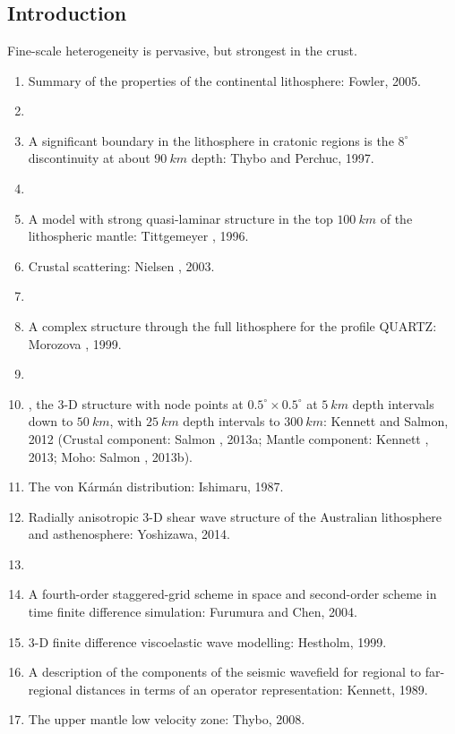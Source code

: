 \renewcommand{\pmk}{Kennett\_2016\_GGG\_Multiscale seismic heterogeneity}
\renewcommand{\prf}{Others/\pmk.pdf}
\renewcommand{\pti}{Multiscale seismic heterogeneity in
the continental lithosphere}
\renewcommand{\pay}{B. L. N. Kennett and T. Furumura, 2016}
\renewcommand{\pjo}{Geochem. Geophys. Geosyst.}
\renewcommand{\pda}{2019/6/2 Sun.}

\section{\pinfo}
\subsection{Introduction}
Fine-scale heterogeneity is pervasive, but strongest in the crust.

\begin{enumerate}[\hspace{10mm}*]
  \item Summary of the properties of the continental lithosphere: Fowler, 2005.
  \item \sline
  \item A significant boundary in the lithosphere in cratonic regions is
    the $8^\circ$ discontinuity at about $90~km$ depth: Thybo and Perchuc, 1997.
  \item \sline
  \item A model with strong quasi-laminar structure in the top $100~km$ of
    the lithospheric mantle: Tittgemeyer \etal, 1996.
  \item Crustal scattering: Nielsen \etal, 2003.
  \item \sline
  \item A complex structure through the full lithosphere
    for the profile QUARTZ: Morozova \etal, 1999.
  \item \sline
  \item {}, the 3-D structure with node points
    at $0.5^\circ\times 0.5^\circ$ at $5~km$ depth intervals down to $50~km$,
    with $25~km$ depth intervals to $300~km$:
    Kennett and Salmon, 2012 (Crustal component: Salmon \etal, 2013a;
    Mantle component: Kennett \etal, 2013; Moho: Salmon \etal, 2013b).
  \item The von K\'arm\'an distribution: Ishimaru, 1987.
  \item Radially anisotropic 3-D shear wave structure of the Australian
    lithosphere and asthenosphere: Yoshizawa, 2014.
  \item \sline
  \item A fourth-order staggered-grid scheme in space and second-order scheme
    in time finite difference simulation: Furumura and Chen, 2004.
  \item 3-D finite difference viscoelastic wave modelling: Hestholm, 1999.
  \item A description of the components of the seismic wavefield for regional
    to far-regional distances in terms of an operator representation:
    Kennett, 1989.
  \item The upper mantle low velocity zone: Thybo, 2008.
\end{enumerate}

